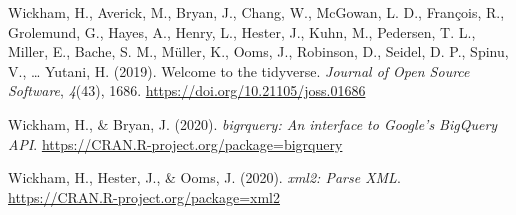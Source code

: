 \documentclass[a4paper,man,floatsintext,longtable,noextraspace,12pt]{apa6}
\newlength{\cslhangindent}
\newenvironment{cslreferences}%
  {\setlength{\parindent}{0pt}%
  \everypar{\setlength{\hangindent}{\cslhangindent}}\ignorespaces}%
  {\par}
\begin{document}
\begin{cslreferences}
\leavevmode\hypertarget{ref-tidyverse}{}%
Wickham, H., Averick, M., Bryan, J., Chang, W., McGowan, L. D.,
François, R., Grolemund, G., Hayes, A., Henry, L., Hester, J., Kuhn, M.,
Pedersen, T. L., Miller, E., Bache, S. M., Müller, K., Ooms, J.,
Robinson, D., Seidel, D. P., Spinu, V., \ldots{} Yutani, H. (2019).
Welcome to the tidyverse. \emph{Journal of Open Source Software},
\emph{4}(43), 1686. \url{https://doi.org/10.21105/joss.01686}

\leavevmode\hypertarget{ref-bigrquery}{}%
Wickham, H., \& Bryan, J. (2020). \emph{bigrquery: An interface to
Google's BigQuery API}.
\url{https://CRAN.R-project.org/package=bigrquery}

\leavevmode\hypertarget{ref-xml2}{}%
Wickham, H., Hester, J., \& Ooms, J. (2020). \emph{xml2: Parse XML}.
\url{https://CRAN.R-project.org/package=xml2}
\end{cslreferences}
\end{document}

